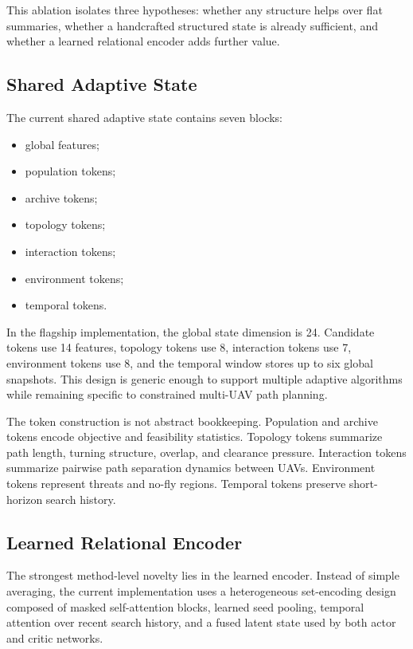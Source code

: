 \documentclass[a4paper,fleqn]{cas-dc}
\begin{document}
This ablation isolates three hypotheses: whether any structure helps over flat summaries, whether a handcrafted structured state is already sufficient, and whether a learned relational encoder adds further value.

\subsection{Shared Adaptive State}

The current shared adaptive state contains seven blocks:
\begin{itemize}
\item global features;
\item population tokens;
\item archive tokens;
\item topology tokens;
\item interaction tokens;
\item environment tokens;
\item temporal tokens.
\end{itemize}

In the flagship implementation, the global state dimension is 24. Candidate tokens use 14 features, topology tokens use 8, interaction tokens use 7, environment tokens use 8, and the temporal window stores up to six global snapshots. This design is generic enough to support multiple adaptive algorithms while remaining specific to constrained multi-UAV path planning.

The token construction is not abstract bookkeeping. Population and archive tokens encode objective and feasibility statistics. Topology tokens summarize path length, turning structure, overlap, and clearance pressure. Interaction tokens summarize pairwise path separation dynamics between UAVs. Environment tokens represent threats and no-fly regions. Temporal tokens preserve short-horizon search history.

\subsection{Learned Relational Encoder}

The strongest method-level novelty lies in the learned encoder. Instead of simple averaging, the current implementation uses a heterogeneous set-encoding design composed of masked self-attention blocks, learned seed pooling, temporal attention over recent search history, and a fused latent state used by both actor and critic networks.
\end{document}
